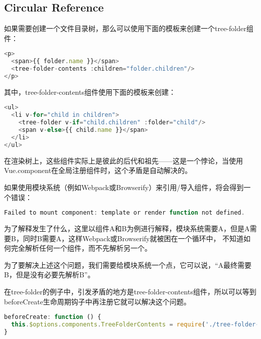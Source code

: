 \subsection{Circular Reference}

如果需要创建一个文件目录树，那么可以使用下面的模板来创建一个tree-folder组件：


\begin{lstlisting}[language=JavaScript]
<p>
  <span>{{ folder.name }}</span>
  <tree-folder-contents :children="folder.children"/>
</p>
\end{lstlisting}

其中，tree-folder-contents组件使用下面的模板来创建：

\begin{lstlisting}[language=JavaScript]
<ul>
  <li v-for="child in children">
    <tree-folder v-if="child.children" :folder="child"/>
    <span v-else>{{ child.name }}</span>
  </li>
</ul>
\end{lstlisting}

在渲染树上，这些组件实际上是彼此的后代和祖先——这是一个悖论，当使用Vue.component在全局注册组件时，这个矛盾是自动解决的。

如果使用模块系统（例如Webpack或Browserify）来引用/导入组件，将会得到一个错误：


\begin{lstlisting}[language=JavaScript]
Failed to mount component: template or render function not defined.
\end{lstlisting}

为了解释发生了什么，这里以组件A和B为例进行解释，模块系统需要A，但是A需要B，同时B需要A，这样Webpack或Browserify就被困在一个循环中， 不知道如何完全解析任何一个组件，而不先解析另一个。 

为了要解决上述这个问题，我们需要给模块系统一个点，它可以说，“A最终需要B，但是没有必要先解析B”。

在tree-folder的例子中，引发矛盾的地方是tree-folder-contents组件，所以可以等到beforeCreate生命周期钩子中再注册它就可以解决这个问题。


\begin{lstlisting}[language=JavaScript]
beforeCreate: function () {
  this.$options.components.TreeFolderContents = require('./tree-folder-contents.vue')
}
\end{lstlisting}


\begin{lstlisting}[language=JavaScript]

\end{lstlisting}




